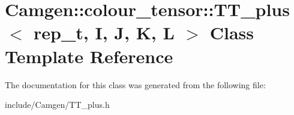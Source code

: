 \hypertarget{a00539}{\section{Camgen\-:\-:colour\-\_\-tensor\-:\-:T\-T\-\_\-plus$<$ rep\-\_\-t, I, J, K, L $>$ Class Template Reference}
\label{a00539}
}


The documentation for this class was generated from the following file\-:\begin{DoxyCompactItemize}
\item 
include/\-Camgen/T\-T\-\_\-plus.\-h\end{DoxyCompactItemize}

